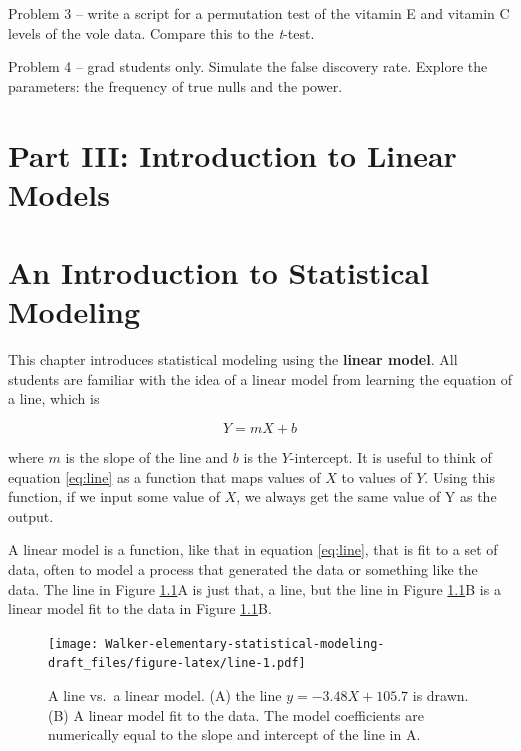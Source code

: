 \documentclass[]{book}
\begin{document}
Problem 3 -- write a script for a permutation test of the vitamin E and vitamin C levels of the vole data. Compare this to the \emph{t}-test.

Problem 4 -- grad students only. Simulate the false discovery rate. Explore the parameters: the frequency of true nulls and the power.

\hypertarget{part-iii-introduction-to-linear-models}{%
\chapter*{Part III: Introduction to Linear Models}\label{part-iii-introduction-to-linear-models}}

\hypertarget{an-introduction-to-statistical-modeling}{%
\chapter{An Introduction to Statistical Modeling}\label{an-introduction-to-statistical-modeling}}

This chapter introduces statistical modeling using the \textbf{linear model}. All students are familiar with the idea of a linear model from learning the equation of a line, which is

\begin{equation}
Y = mX + b
\label{eq:line}
\end{equation}

where \(m\) is the slope of the line and \(b\) is the \(Y\)-intercept. It is useful to think of equation \eqref{eq:line} as a function that maps values of \(X\) to values of \(Y\). Using this function, if we input some value of \(X\), we always get the same value of Y as the output.

A linear model is a function, like that in equation \eqref{eq:line}, that is fit to a set of data, often to model a process that generated the data or something like the data. The line in Figure \ref{fig:line}A is just that, a line, but the line in Figure \ref{fig:line}B is a linear model fit to the data in Figure \ref{fig:line}B.

\begin{figure}
\centering
\texttt{[image: Walker-elementary-statistical-modeling-draft\_files/figure-latex/line-1.pdf]}
\caption{\label{fig:line}A line vs.~a linear model. (A) the line \(y=-3.48X + 105.7\) is drawn. (B) A linear model fit to the data. The model coefficients are numerically equal to the slope and intercept of the line in A.}
\end{figure}
\end{document}
